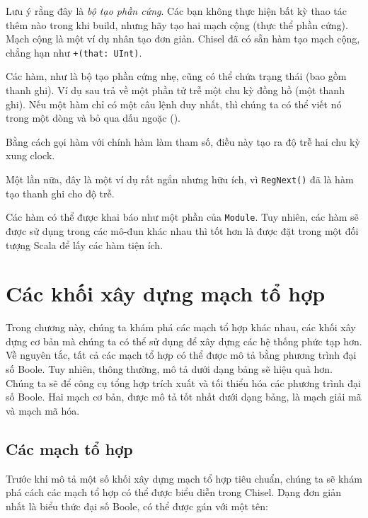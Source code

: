 \documentclass[%
    10pt,
    headinclude, footexclude,
    openright, %
    notitlepage,
    cleardoubleempty,
    headsepline,
    pointlessnumbers,
    bibtotoc, idxtotoc,
    ]{scrbook}
\newcommand{\code}[1]{{\small{\texttt{#1}}}}
\begin{document}

\noindent Lưu ý rằng đây là \emph{bộ tạo phần cứng}. Các bạn không thực hiện bất kỳ thao tác thêm 
nào trong khi build, nhưng hãy tạo hai mạch cộng (thực thể phần cứng). Mạch cộng là một ví dụ nhân tạo đơn giản. 
Chisel đã có sẵn hàm tạo mạch cộng, chẳng hạn như \code{+(that: UInt)}.

Các hàm, như là bộ tạo phần cứng nhẹ, cũng có thể chứa trạng thái (bao gồm thanh ghi).
Ví dụ sau trả về một phần tử trễ một chu kỳ đồng hồ (một thanh ghi).
Nếu một hàm chỉ có một câu lệnh duy nhất, thì chúng ta có thể viết nó trong một dòng và bỏ qua dấu ngoặc ({}).


\noindent Bằng cách gọi hàm với chính hàm làm tham số, điều này tạo ra độ trễ hai chu kỳ xung clock.


\noindent Một lần nữa, đây là một ví dụ rất ngắn nhưng hữu ích, vì \code{RegNext()} đã là hàm tạo thanh ghi cho độ trễ.

Các hàm có thể được khai báo như một phần của \code{Module}. Tuy nhiên, các hàm sẽ được 
sử dụng trong các mô-đun khác nhau  thì tốt hơn là được đặt trong một đối tượng Scala 
để lấy các hàm tiện ích.

\chapter{Các khối xây dựng mạch tổ hợp}

Trong chương này, chúng ta khám phá các mạch tổ hợp khác nhau, các khối xây dựng cơ bản mà 
chúng ta có thể sử dụng để xây dựng các hệ thống phức tạp hơn.
Về nguyên tắc, tất cả các mạch tổ hợp có thể được mô tả bằng phương trình đại số Boole.
Tuy nhiên, thông thường, mô tả dưới dạng bảng sẽ hiệu quả hơn.
Chúng ta sẽ để công cụ tổng hợp trích xuất và tối thiểu hóa các phương trình đại số Boole.
Hai mạch cơ bản, được mô tả tốt nhất dưới dạng bảng, là mạch giải mã và mạch mã hóa.

\section{Các mạch tổ hợp}


Trước khi mô tả một số khối xây dựng mạch tổ hợp tiêu chuẩn, chúng ta sẽ khám phá 
cách các mạch tổ hợp có thể được biểu diễn trong Chisel.
Dạng đơn giản nhất là biểu thức đại số Boole, có thể được gán với một tên:
\end{document}
